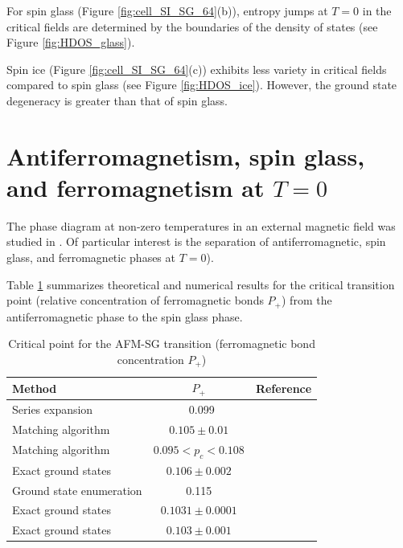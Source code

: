 \documentclass[utf8, babel, sor, jor, amsmath, amssymb, reprint]{elsarticle} %
\begin{document}
For spin glass (Figure \ref{fig:cell_SI_SG_64}(b)), entropy jumps at $T=0$ in the critical fields are determined by the boundaries of the density of states (see Figure \ref{fig:HDOS_glass}).


Spin ice (Figure \ref{fig:cell_SI_SG_64}(c)) exhibits less variety in critical fields compared to spin glass (see Figure \ref{fig:HDOS_ice}). However, the ground state degeneracy is greater than that of spin glass.


\section{Antiferromagnetism, spin glass, and ferromagnetism at $T = 0$}

The phase diagram at non-zero temperatures in an external magnetic field was studied in \cite{trukhin2024thermodynamic}. Of particular interest is the separation of antiferromagnetic, spin glass, and ferromagnetic phases at $T = 0$).

Table \ref{tab:lit_phase} summarizes theoretical and numerical results for the critical transition point (relative concentration of ferromagnetic bonds $P_+$) from the antiferromagnetic phase to the spin glass phase.

\begin{table}[!h]
	\centering
	\begin{tabular}{|l|c|l|}
		\hline
		Method & \( P_{+} \) & Reference \\ \hline
		Series expansion & ~0.099 & \cite{PhysRevB.19.260} \\ \hline
		Matching algorithm & \( 0.105 \pm 0.01 \) & \cite{H_Freund_1989} \\ \hline
		Matching algorithm & \( 0.095 < p_c < 0.108 \) & \cite{BENDISCH1994139} \\ \hline
		Exact ground states & \( 0.106 \pm 0.002 \) & \cite{N.Kawashima_1997} \\ \hline
		Ground state enumeration & 0.115 & \cite{PhysRevE.58.1502} \\ \hline
		Exact ground states & \( 0.1031 \pm 0.0001 \) & \cite{WANG200331} \\ \hline
		Exact ground states & \( 0.103 \pm 0.001 \) & \cite{amoruso2004domain} \\ \hline
	\end{tabular}
	\caption{Critical point for the AFM-SG transition (ferromagnetic bond concentration \( P_+ \))}
	\label{tab:lit_phase}
\end{table}
\end{document}
